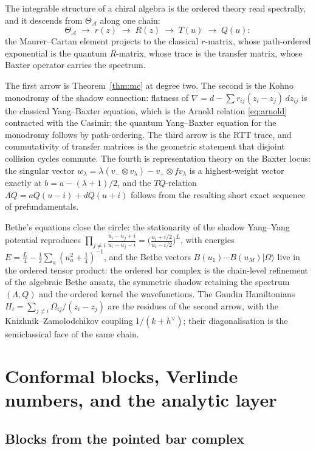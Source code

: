 \documentclass[11pt]{amsart}
\numberwithin{equation}{section}
\theoremstyle{plain}
\theoremstyle{definition}
\theoremstyle{remark}
\newcommand{\cA}{\mathcal{A}}
\newcommand{\dvee}{h^{\vee}}
\begin{document}
The integrable structure of a chiral algebra is the ordered theory read
spectrally, and it descends from $\Theta_{\cA}$ along one chain:
\begin{equation}
\Theta_{\cA}\;\longrightarrow\;r(z)\;\longrightarrow\;R(z)
\;\longrightarrow\;T(u)\;\longrightarrow\;Q(u):
\end{equation}
the Maurer--Cartan element projects to the classical $r$-matrix, whose
path-ordered exponential is the quantum $R$-matrix, whose trace is the
transfer matrix, whose Baxter operator carries the spectrum.

The first arrow is Theorem~\ref{thm:mc} at degree two. The second is
the Kohno monodromy of the shadow connection: flatness of
$\nabla=d-\sum r_{ij}(z_i-z_j)\,dz_{ij}$ is the classical Yang--Baxter
equation, which is the Arnold relation \eqref{eq:arnold} contracted
with the Casimir; the quantum Yang--Baxter equation for the monodromy
follows by path-ordering. The third arrow is the RTT trace, and
commutativity of transfer matrices is the geometric statement that
disjoint collision cycles commute. The fourth is representation
theory on the Baxter locus: the singular vector
$w_\lambda=\lambda(v_-\otimes v_\lambda)-v_+\otimes fv_\lambda$ is a
highest-weight vector exactly at $b=a-(\lambda+1)/2$, and the
$TQ$-relation $\Lambda Q=aQ(u-i)+dQ(u+i)$ follows from the resulting
short exact sequence of prefundamentals.

Bethe's equations close the circle: the stationarity of the shadow
Yang--Yang potential reproduces
$\prod_{j\neq i}\frac{u_i-u_j+i}{u_i-u_j-i}
=\bigl(\frac{u_i+i/2}{u_i-i/2}\bigr)^{L}$, with energies
$E=\tfrac{L}{4}-\tfrac12\sum_a(u_a^{2}+\tfrac14)^{-1}$, and the Bethe
vectors $B(u_1)\cdots B(u_M)\lvert\Omega\rangle$ live in the ordered
tensor product: the ordered bar complex is the chain-level refinement
of the algebraic Bethe ansatz, the symmetric shadow retaining the
spectrum $(\Lambda,Q)$ and the ordered kernel the wavefunctions. The
Gaudin Hamiltonians $H_i=\sum_{j\neq i}\Omega_{ij}/(z_i-z_j)$ are the
residues of the second arrow, with the Knizhnik--Zamolodchikov coupling
$1/(k+\dvee)$; their diagonalisation is the semiclassical face of the
same chain.

\section{Conformal blocks, Verlinde numbers, and the analytic layer}
\label{sec:blocks}

\subsection{Blocks from the pointed bar complex}
\end{document}
